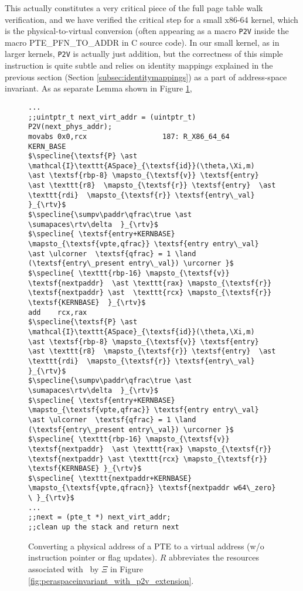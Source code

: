 This actually constitutes a very critical piece of the full page table walk verification, and we have verified the critical step for a small x86-64 kernel, which is the physical-to-virtual conversion (often appearing as a macro \texttt{P2V} inside the macro \textsf{ PTE\_PFN\_TO\_ADDR} in C source code). In our small kernel, as in larger kernels, \texttt{P2V} is actually just addition, but the correctness of this simple instruction is quite subtle and relies on identity mappings explained in the previous section (Section \ref{subsec:identitymappings}) as a part of address-space invariant.  As as separate Lemma shown in Figure \ref{fig:p2v}, 
\begin{figure}\footnotesize
\begin{lstlisting}[mathescape]
...
;;uintptr_t next_virt_addr = (uintptr_t) P2V(next_phys_addr);
movabs 0x0,rcx	                187: R_X86_64_64	KERN_BASE
$\specline{\textsf{P} \ast \mathcal{I}\texttt{ASpace}_{\textsf{id}}(\theta,\Xi,m)  \ast \textsf{rbp-8} \mapsto_{\textsf{v}} \textsf{entry} \ast \texttt{r8}  \mapsto_{\textsf{r}} \textsf{entry}  \ast \texttt{rdi}  \mapsto_{\textsf{r}} \textsf{entry\_val}  }_{\rtv}$
$\specline{\sumpv\paddr\qfrac\true \ast \sumapaces\rtv\delta  }_{\rtv}$
$\specline{ \textsf{entry+KERNBASE} \mapsto_{\textsf{vpte,qfrac}} \textsf{entry entry\_val} \ast \ulcorner  \textsf{qfrac} = 1 \land (\textsf{entry\_present entry\_val}) \urcorner }$
$\specline{ \texttt{rbp-16} \mapsto_{\textsf{v}} \textsf{nextpaddr}  \ast \texttt{rax} \mapsto_{\textsf{r}} \textsf{nextpaddr} \ast  \texttt{rcx} \mapsto_{\textsf{r}} \textsf{KERNBASE}  }_{\rtv}$
add    rcx,rax
$\specline{\textsf{P} \ast \mathcal{I}\texttt{ASpace}_{\textsf{id}}(\theta,\Xi,m)  \ast \textsf{rbp-8} \mapsto_{\textsf{v}} \textsf{entry} \ast \texttt{r8}  \mapsto_{\textsf{r}} \textsf{entry}  \ast \texttt{rdi}  \mapsto_{\textsf{r}} \textsf{entry\_val}  }_{\rtv}$
$\specline{\sumpv\paddr\qfrac\true \ast \sumapaces\rtv\delta  }_{\rtv}$
$\specline{ \textsf{entry+KERNBASE} \mapsto_{\textsf{vpte,qfrac}} \textsf{entry entry\_val} \ast \ulcorner  \textsf{qfrac} = 1 \land (\textsf{entry\_present entry\_val}) \urcorner }$
$\specline{ \texttt{rbp-16} \mapsto_{\textsf{v}} \textsf{nextpaddr}  \ast \texttt{rax} \mapsto_{\textsf{r}} \textsf{nextpaddr} \ast \texttt{rcx} \mapsto_{\textsf{r}} \textsf{KERNBASE} }_{\rtv}$
$\specline{ \texttt{nextpaddr+KERNBASE} \mapsto_{\textsf{vpte,qfracn}} \textsf{nextpaddr w64\_zero} \ }_{\rtv}$
...
;;next = (pte_t *) next_virt_addr;
;;clean up the stack and return next
\end{lstlisting}
\vspace{-1em}
\caption{Converting a physical address of a PTE to a virtual address (w/o instruction pointer or flag updates). $R$ abbreviates the resources
associated with \paddr\ by $\Xi$ in Figure \ref{fig:peraspaceinvariant_with_p2v_extension}.}
\label{fig:p2v}
\end{figure}

